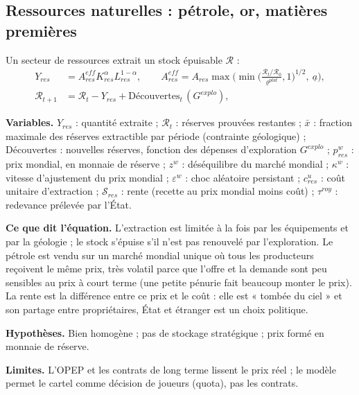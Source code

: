 \documentclass[11pt,a4paper]{article}
\newcommand{\variables}{\par\noindent\textbf{Variables.} }
\newcommand{\sens}{\par\noindent\textbf{Ce que dit l'équation.} }
\newcommand{\hyp}{\par\noindent\textbf{Hypothèses.} }
\newcommand{\limites}{\par\noindent\textbf{Limites.} }
\begin{document}
\subsection{Ressources naturelles : pétrole, or, matières premières}
Un secteur de ressources extrait un stock épuisable $\mathcal{R}$ :
\begin{equation}
\begin{split}
Y_{res} &= A^{eff}_{res} K_{res}^{\alpha} L_{res}^{1-\alpha}, \qquad A^{eff}_{res} = A_{res}\max\!\Big(\min\!\Big(\frac{\mathcal{R}_t/\mathcal{R}_0}{\varrho^{plat}},1\Big)^{\!1/2},\ \underline a\Big),\\
\mathcal{R}_{t+1} &= \mathcal{R}_t - Y_{res} + \text{Découvertes}_t\,(G^{explo}),
\end{split}
\end{equation}
\begin{lecture}
\variables $Y_{res}$ : quantité extraite ; $\mathcal{R}_t$ : réserves prouvées restantes ; $\bar x$ : fraction maximale des réserves extractible par période (contrainte géologique) ; Découvertes : nouvelles réserves, fonction des dépenses d'exploration $G^{explo}$ ; $p^w_{res}$ : prix mondial, en monnaie de réserve ; $z^w$ : déséquilibre du marché mondial ; $\kappa^w$ : vitesse d'ajustement du prix mondial ; $\varepsilon^w$ : choc aléatoire persistant ; $c^u_{res}$ : coût unitaire d'extraction ; $\mathcal{S}_{res}$ : rente (recette au prix mondial moins coût) ; $\tau^{roy}$ : redevance prélevée par l'État.
\sens L'extraction est limitée à la fois par les équipements et par la géologie ; le stock s'épuise s'il n'est pas renouvelé par l'exploration. Le pétrole est vendu sur un marché mondial unique où tous les producteurs reçoivent le même prix, très volatil parce que l'offre et la demande sont peu sensibles au prix à court terme (une petite pénurie fait beaucoup monter le prix). La rente est la différence entre ce prix et le coût : elle est « tombée du ciel » et son partage entre propriétaires, État et étranger est un choix politique.
\hyp Bien homogène ; pas de stockage stratégique ; prix formé en monnaie de réserve.
\limites L'OPEP et les contrats de long terme lissent le prix réel ; le modèle permet le cartel comme décision de joueurs (quota), pas les contrats.

\end{lecture}
\end{document}

